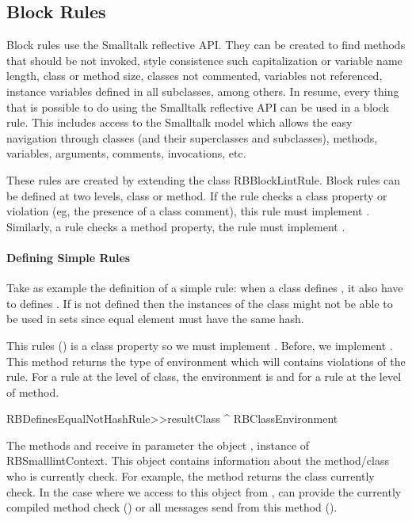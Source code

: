 \documentclass[a4paper,10pt,twoside]{book}
\begin{document}
\subsection{Block Rules}

Block rules use the Smalltalk reflective API. They can be created to find methods that should be not invoked, style consistence such capitalization or variable name length, class or method size, classes not commented, variables not referenced, instance variables defined in all subclasses, among others. In resume, every thing that is possible to do using the Smalltalk reflective API can be used in a block rule. This includes access to the Smalltalk model which allows the easy navigation through classes (and their superclasses and subclasses), methods, variables, arguments, comments, invocations, etc.

These rules are created by extending the class RBBlockLintRule.
 Block rules can be defined at two levels, class or method. If the rule checks a class property or violation (eg, the presence of a class comment), this rule must implement . Similarly, a rule checks  a method property, the rule must implement .

\paragraph{Defining Simple Rules}
Take as example the definition of a simple rule:  when a class defines \ct{=}, it also have to defines  . If  is not defined then the instances of the class might not be able to be used in sets since equal element must have the same hash.

This rules () is a class property so we must implement . Before, we implement . This method returns the type of environment which will contains violations of the rule. For a rule at the level of class, the environment is  and  for  a rule at the level of method.

\begin{code}{}
RBDefinesEqualNotHashRule>>resultClass
	^ RBClassEnvironment
\end{code}

The methods  and  receive in parameter the object ,  instance of RBSmalllintContext. This object contains information about the method/class who is currently check. For example, the method  returns the class currently check. In the case where we access to this object from ,  can provide the currently compiled method check () or all messages send from this method ().
\end{document}
